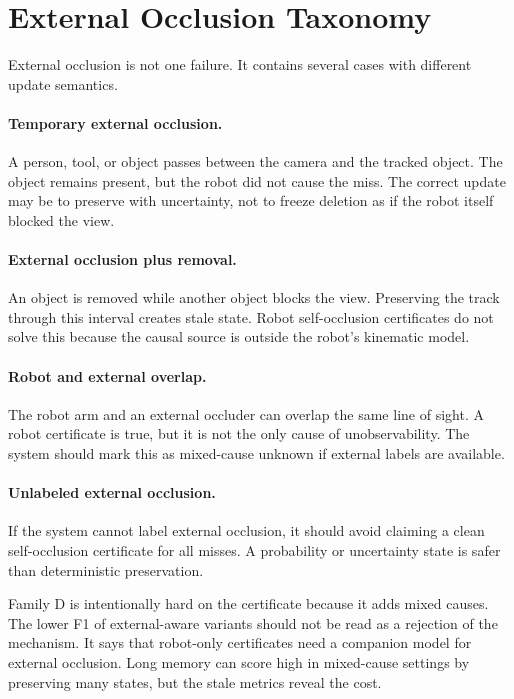 \documentclass{article}
\begin{document}
\section{External Occlusion Taxonomy}

External occlusion is not one failure. It contains several cases with different
update semantics.

\paragraph{Temporary external occlusion.}
A person, tool, or object passes between the camera and the tracked object. The
object remains present, but the robot did not cause the miss. The correct update
may be to preserve with uncertainty, not to freeze deletion as if the robot
itself blocked the view.

\paragraph{External occlusion plus removal.}
An object is removed while another object blocks the view. Preserving the track
through this interval creates stale state. Robot self-occlusion certificates do
not solve this because the causal source is outside the robot's kinematic
model.

\paragraph{Robot and external overlap.}
The robot arm and an external occluder can overlap the same line of sight. A
robot certificate is true, but it is not the only cause of unobservability. The
system should mark this as mixed-cause unknown if external labels are available.

\paragraph{Unlabeled external occlusion.}
If the system cannot label external occlusion, it should avoid claiming a clean
self-occlusion certificate for all misses. A probability or uncertainty state is
safer than deterministic preservation.

Family D is intentionally hard on the certificate because it adds mixed causes.
The lower F1 of external-aware variants should not be read as a rejection of the
mechanism. It says that robot-only certificates need a companion model for
external occlusion. Long memory can score high in mixed-cause settings by
preserving many states, but the stale metrics reveal the cost.
\end{document}
